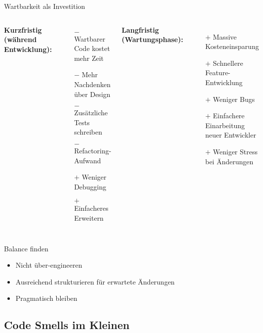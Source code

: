 \begin{frame}{Wartbarkeit als Investition}
  \begin{columns}[T]
    \textbf{Kurzfristig (während Entwicklung):}
    \begin{itemize}
      \item[$-$] Wartbarer Code kostet mehr Zeit
      \item[$-$] Mehr Nachdenken über Design
      \item[$-$] Zusätzliche Tests schreiben
      \item[$-$] Refactoring-Aufwand
      \item[$+$] Weniger Debugging
      \item[$+$] Einfacheres Erweitern
    \end{itemize}

    \textbf{Langfristig (Wartungsphase):}
    \begin{itemize}
      \item[$+$] Massive Kosteneinsparung
      \item[$+$] Schnellere Feature-Entwicklung
      \item[$+$] Weniger Bugs
      \item[$+$] Einfachere Einarbeitung neuer Entwickler
      \item[$+$] Weniger Stress bei Änderungen
    \end{itemize}
  \end{columns}

  \begin{exampleblock}{Balance finden}
    \begin{itemize}
      \item Nicht über-engineeren
      \item Ausreichend strukturieren für erwartete Änderungen
      \item Pragmatisch bleiben
    \end{itemize}
  \end{exampleblock}
\end{frame}


\subsection{Code Smells im Kleinen}

